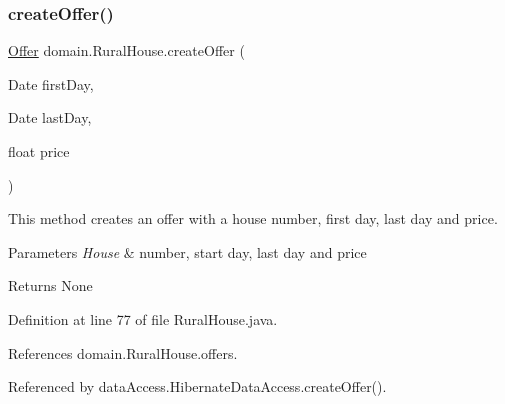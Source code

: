 \subsubsection{\texorpdfstring{createOffer()}{createOffer()}}
{\footnotesize\ttfamily \mbox{\hyperlink{classdomain_1_1Offer}{Offer}} domain.\+Rural\+House.\+create\+Offer (\begin{DoxyParamCaption}\item[{Date}]{first\+Day,  }\item[{Date}]{last\+Day,  }\item[{float}]{price }\end{DoxyParamCaption})}



This method creates an offer with a house number, first day, last day and price. 


\begin{DoxyParams}{Parameters}
{\em House} & number, start day, last day and price \\
\hline
\end{DoxyParams}
\begin{DoxyReturn}{Returns}
None 
\end{DoxyReturn}


Definition at line 77 of file Rural\+House.\+java.


\begin{DoxyCode}{0}

\end{DoxyCode}


References domain.\+Rural\+House.\+offers.



Referenced by data\+Access.\+Hibernate\+Data\+Access.\+create\+Offer().

\mbox{\label{classdomain_1_1RuralHouse_a92f3f1fa5d605f34e95f4e4175ef2629}} 
